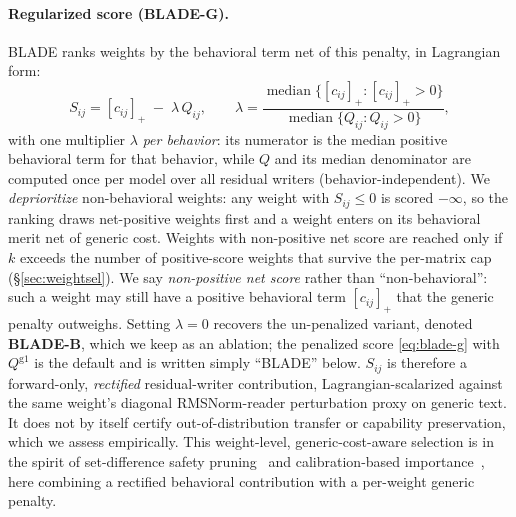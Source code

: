 \paragraph{Regularized score (BLADE-G).} BLADE ranks weights by the behavioral term net of this penalty, in Lagrangian form:
\begin{equation}
  S_{ij}=[c_{ij}]_+\;-\;\lambda\,Q_{ij},
  \qquad
  \lambda=\frac{\operatorname{median}\{[c_{ij}]_+ : [c_{ij}]_+>0\}}{\operatorname{median}\{Q_{ij} : Q_{ij}>0\}},
  \label{eq:blade-g}
\end{equation}
with one multiplier $\lambda$ \emph{per behavior}: its numerator is the median positive behavioral term for that behavior, while $Q$ and its median denominator are computed once per model over all residual writers (behavior-independent). We \emph{deprioritize} non-behavioral weights: any weight with $S_{ij}\le 0$ is scored $-\infty$, so the ranking draws net-positive weights first and a weight enters on its behavioral merit net of generic cost. Weights with non-positive net score are reached only if $k$ exceeds the number of positive-score weights that survive the per-matrix cap (\S\ref{sec:weightsel}). We say \emph{non-positive net score} rather than ``non-behavioral'': such a weight may still have a positive behavioral term $[c_{ij}]_+$ that the generic penalty outweighs. Setting $\lambda=0$ recovers the un-penalized variant, denoted \textbf{BLADE-B}, which we keep as an ablation; the penalized score \eqref{eq:blade-g} with $Q^{\mathrm{g1}}$ is the default and is written simply ``BLADE'' below. $S_{ij}$ is therefore a forward-only, \emph{rectified} residual-writer contribution, Lagrangian-scalarized against the same weight's diagonal RMSNorm-reader perturbation proxy on generic text. It does not by itself certify out-of-distribution transfer or capability preservation, which we assess empirically. This weight-level, generic-cost-aware selection is in the spirit of set-difference safety pruning~\cite{wei2024brittleness} and calibration-based importance~\cite{sun2023wanda}, here combining a rectified behavioral contribution with a per-weight generic penalty.

